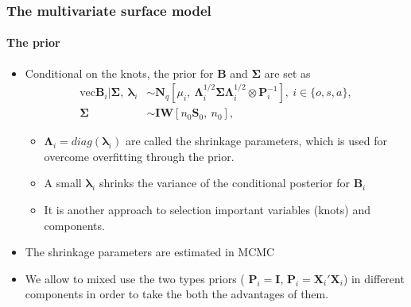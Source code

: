\documentclass[11pt]{beamer}
\begin{document}
\begin{frame}
  \frametitle{The multivariate surface model}
  \framesubtitle{The prior}
  \begin{itemize}
  \item Conditional on the knots, the prior for $\bm{B}$ and
    $\bm{\Sigma}$ are set as
    \[
    \begin{split}
      \mathrm{vec}\bm{B}_i |\bm{\Sigma},~\bm{\lambda}_i &\sim \bm{N}_q\left[
        \mu _i, ~\bm{\Lambda}_i^{1/2} \bm{\Sigma} \bm{\Lambda}_i^{1/2} \otimes
        \bm{P}_i^{-1}
      \right], ~i\in \{o,s,a \},\\
      \bm{\Sigma} &\sim \bm{IW} \left[n_0 \bm{S}_0,~n_0\right],
    \end{split}
    \]
    \begin{itemize}

    \item $\bm{\Lambda}_i=diag(\bm{\lambda}_i)$ are called the
      shrinkage parameters, which is used for overcome overfitting
      through the prior.

    \item A small $\bm{\lambda}_{i}$ shrinks the variance of the
      conditional posterior for $\bm{B}_i$
    \item It is another approach to selection important variables
      (knots) and components.



    \end{itemize}
  \item The shrinkage parameters are estimated in MCMC
  \item We allow to mixed use the two types priors ( $\bm{P}_i=\bm{I}$,
    $\bm{P}_i=\bm{X}_i'\bm{X}_i$) in different components in order to take the both
    the advantages of them.
  \end{itemize}
\end{frame}
\end{document}
